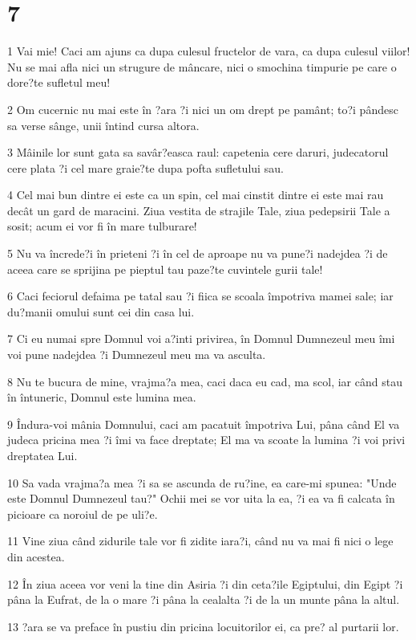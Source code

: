 \chapter{7}

\par 1 Vai mie! Caci am ajuns ca dupa culesul fructelor de vara, ca dupa culesul viilor! Nu se mai afla nici un strugure de mâncare, nici o smochina timpurie pe care o dore?te sufletul meu!
\par 2 Om cucernic nu mai este în ?ara ?i nici un om drept pe pamânt; to?i pândesc sa verse sânge, unii întind cursa altora.
\par 3 Mâinile lor sunt gata sa savâr?easca raul: capetenia cere daruri, judecatorul cere plata ?i cel mare graie?te dupa pofta sufletului sau.
\par 4 Cel mai bun dintre ei este ca un spin, cel mai cinstit dintre ei este mai rau decât un gard de maracini. Ziua vestita de strajile Tale, ziua pedepsirii Tale a sosit; acum ei vor fi în mare tulburare!
\par 5 Nu va încrede?i în prieteni ?i în cel de aproape nu va pune?i nadejdea ?i de aceea care se sprijina pe pieptul tau paze?te cuvintele gurii tale!
\par 6 Caci feciorul defaima pe tatal sau ?i fiica se scoala împotriva mamei sale; iar du?manii omului sunt cei din casa lui.
\par 7 Ci eu numai spre Domnul voi a?inti privirea, în Domnul Dumnezeul meu îmi voi pune nadejdea ?i Dumnezeul meu ma va asculta.
\par 8 Nu te bucura de mine, vrajma?a mea, caci daca eu cad, ma scol, iar când stau în întuneric, Domnul este lumina mea.
\par 9 Îndura-voi mânia Domnului, caci am pacatuit împotriva Lui, pâna când El va judeca pricina mea ?i îmi va face dreptate; El ma va scoate la lumina ?i voi privi dreptatea Lui.
\par 10 Sa vada vrajma?a mea ?i sa se ascunda de ru?ine, ea care-mi spunea: "Unde este Domnul Dumnezeul tau?" Ochii mei se vor uita la ea, ?i ea va fi calcata în picioare ca noroiul de pe uli?e.
\par 11 Vine ziua când zidurile tale vor fi zidite iara?i, când nu va mai fi nici o lege din acestea.
\par 12 În ziua aceea vor veni la tine din Asiria ?i din ceta?ile Egiptului, din Egipt ?i pâna la Eufrat, de la o mare ?i pâna la cealalta ?i de la un munte pâna la altul.
\par 13 ?ara se va preface în pustiu din pricina locuitorilor ei, ca pre? al purtarii lor.
